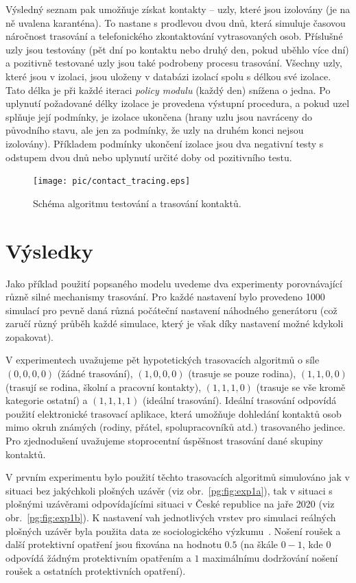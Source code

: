 Výsledný seznam pak umožňuje získat kontakty -- uzly, které jsou izolovány (je na
ně uvalena karanténa). To nastane s prodlevou dvou dnů, která simuluje časovou
náročnost trasování a telefonického zkontaktování vytrasovaných osob.
Příslušné uzly jsou testovány (pět dní po kontaktu nebo druhý den, pokud uběhlo
více dní) a pozitivně testované uzly jsou také podrobeny procesu trasování. 
Všechny uzly, které jsou v izolaci, jsou uloženy v databázi izolací spolu s délkou
své izolace. Tato délka je při každé iteraci {\em policy modulu} (každý den)
snížena o jedna. Po uplynutí požadované délky izolace je provedena výstupní
procedura, a pokud uzel splňuje její podmínky, je izolace ukončena (hrany uzlu
jsou navráceny do původního stavu, ale jen za podmínky, že uzly na druhém konci
nejsou izolovány). Příkladem podmínky ukončení izolace jsou dva negativní testy s
odstupem dvou dnů nebo uplynutí určité doby od pozitivního testu.


\begin{figure}
  \centering \texttt{[image: pic/contact\_tracing.eps]}
  \caption{Schéma algoritmu testování a trasování kontaktů.}
  \label{pg:fig:ct}
\end{figure}

\section*{Výsledky}
Jako příklad použití popsaného modelu uvedeme dva experimenty porovnávající
různě silné mechanismy trasování. Pro každé nastavení bylo provedeno 1000
simulací pro pevně daná různá počáteční nastavení náhodného
generátoru (což zaručí různý průběh každé simulace, který je však díky nastavení možné kdykoli zopakovat).

V experimentech uvažujeme pět hypotetických trasovacích algoritmů o
síle $(0, 0, 0, 0)$ (žádné trasování), $(1, 0, 0, 0)$ (trasuje se
pouze rodina), $(1, 1, 0, 0)$ (trasují se rodina, školní a pracovní
kontakty), $(1, 1, 1, 0)$ (trasuje se vše kromě kategorie ostatní) a
$(1, 1, 1, 1)$ (ideální trasování). Ideální trasování odpovídá použití
elektronické trasovací aplikace, která umožňuje dohledání kontaktů
osob mimo okruh známých (rodiny, přátel, spolupracovníků atd.) trasovaného jedince. Pro zjednodušení
uvažujeme stoprocentní úspěšnost trasování dané skupiny kontaktů.

V prvním experimentu bylo použití těchto trasovacích algoritmů
simulováno jak v situaci bez jakýchkoli plošných uzávěr (viz
obr.~\ref{pg:fig:exp1a}), tak v situaci s plošnými uzávěrami
odpovídajícími situaci v České republice na jaře 2020 (viz
obr.~\ref{pg:fig:exp1b}). K nastavení vah jednotlivých vrstev pro
simulaci reálných plošných uzávěr byla použita data ze sociologického
výzkumu~\cite{pg:paqcovid}. Nošení roušek a další protektivní opatření
jsou fixována na hodnotu $0.5$ (na škále $0 - 1$, kde $0$ odpovídá
žádným protektivním opatřením a $1$ maximálnímu dodržování nošení
roušek a ostatních protektivních opatření).

